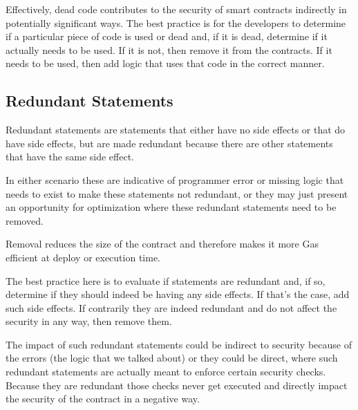 Effectively, dead code contributes to the security of smart contracts
indirectly in potentially significant ways. The best practice is for the
developers to determine if a particular piece of code is used or dead
and, if it is dead, determine if it actually needs to be used. If it is
not, then remove it from the contracts. If it needs to be used, then add
logic that uses that code in the correct manner.

\subsection{Redundant Statements}\label{redundant-statements}

Redundant statements are statements that either have no side effects or
that do have side effects, but are made redundant because there are
other statements that have the same side effect.

In either scenario these are indicative of programmer error or missing
logic that needs to exist to make these statements not redundant, or
they may just present an opportunity for optimization where these
redundant statements need to be removed.

Removal reduces the size of the contract and therefore makes it more Gas
efficient at deploy or execution time.

The best practice here is to evaluate if statements are redundant and,
if so, determine if they should indeed be having any side effects. If
that's the case, add such side effects. If contrarily they are indeed
redundant and do not affect the security in any way, then remove them.

The impact of such redundant statements could be indirect to security
because of the errors (the logic that we talked about) or they could be
direct, where such redundant statements are actually meant to enforce
certain security checks. Because they are redundant those checks never
get executed and directly impact the security of the contract in a
negative way.
